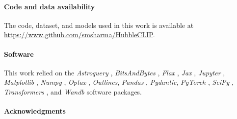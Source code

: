 \documentclass[10pt]{article} %
\newcommand{\package}[1]{\textsl{#1}\xspace}
\begin{document}



\paragraph*{Code and data availability}

The code, dataset, and models used in this work is available at \url{https://www.github.com/smsharma/HubbleCLIP}.

\paragraph*{Software}

This work relied on the \package{Astroquery} \citep{2019AJ....157...98G}, \package{BitsAndBytes} \citep{dettmers2022llmint8}, \package{Flax} \citep{flax2020github}, \package{Jax} \citep{jax2018github}, \package{Jupyter} \citep{Kluyver2016jupyter}, \package{Matplotlib} \citep{Hunter:2007}, \package{Numpy} \citep{harris2020array}, \package{Optax} \citep{deepmind2020jax}, \package{Outlines}, \package{Pandas} \citep{2020SciPy-NMeth}, \package{Pydantic}, \package{PyTorch} \citep{paszke2019pytorch}, \package{SciPy} \citep{2020SciPy-NMeth}, \package{Transformers} \citep{wolf2019huggingface}, and \package{Wandb} \citep{wandb} software packages.



\paragraph*{Acknowledgments}
\end{document}
